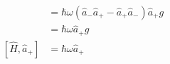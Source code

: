 \documentclass{article}
\begin{document}
\begin{enumerate}
\begin{align*}
                                 & = \hbar \omega (\hat{a}_- \hat{a}_+ - \hat{a}_+ \hat{a}_-) \hat{a}_+ g                                                                                              \\
                                 & = \hbar \omega \hat{a}_+ g                                                                                                                                          \\
          [\hat{H}, \hat{a}_+]   & = \hbar \omega \hat{a}_+
        \end{align*}
\end{enumerate}

\subsection{}
\end{document}
